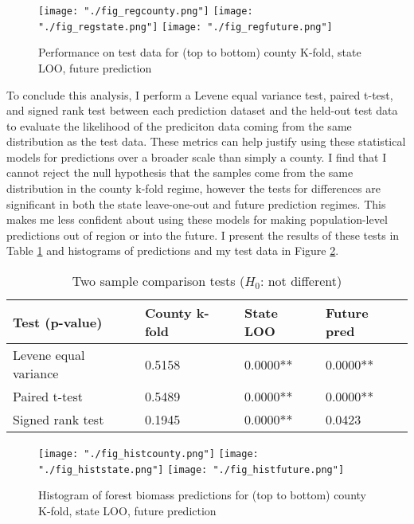 \documentclass{article}
\begin{document}
\begin{figure}[!htbp]
  \centering
  \texttt{[image: "./fig\_regcounty.png"]}
  \texttt{[image: "./fig\_regstate.png"]}
  \texttt{[image: "./fig\_regfuture.png"]}
  \caption{\label{fig:testreg} Performance on test data for (top to bottom) county K-fold, state LOO, future prediction}
\end{figure}

To conclude this analysis, I perform a Levene equal variance test, paired t-test, and signed rank test between each prediction dataset and the held-out test data to evaluate the likelihood of the prediciton data coming from the same distribution as the test data. These metrics can help justify using these statistical models for predictions over a broader scale than simply a county. I find that I cannot reject the null hypothesis that the samples come from the same distribution in the county k-fold regime, however the tests for differences are significant in both the state leave-one-out and future prediction regimes. This makes me less confident about using these models for making population-level predictions out of region or into the future. I present the results of these tests in Table \ref{tab:twosample} and histograms of predictions and my test data in Figure \ref{fig:testhist}.

\begin{table}[!htbp]
  \small
  \begin{center}
    \begin{tabular}{llll}
    \textbf{Test (p-value)} & \textbf{County k-fold} & \textbf{State LOO} & \textbf{Future pred}\\
    \bottomrule
    Levene equal variance & 0.5158 & 0.0000** & 0.0000**\\
    Paired t-test & 0.5489 & 0.0000** & 0.0000**\\
    Signed rank test & 0.1945 & 0.0000** & 0.0423\\
    \bottomrule
    \end{tabular}
    \end{center}
    \caption{\label{tab:twosample} Two sample comparison tests ($H_0$: not different)}
\end{table}

\begin{figure}[!htbp]
  \centering
  \texttt{[image: "./fig\_histcounty.png"]}
  \texttt{[image: "./fig\_histstate.png"]}
  \texttt{[image: "./fig\_histfuture.png"]}
  \caption{\label{fig:testhist} Histogram of forest biomass predictions for (top to bottom) county K-fold, state LOO, future prediction}
\end{figure}
\end{document}
